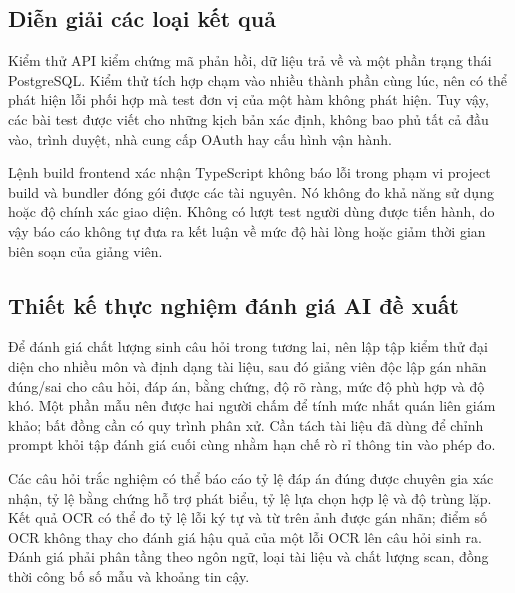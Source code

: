 \subsection{Diễn giải các loại kết quả}
Kiểm thử API kiểm chứng mã phản hồi, dữ liệu trả về và một phần trạng thái
PostgreSQL. Kiểm thử tích hợp chạm vào nhiều thành phần cùng lúc, nên có
thể phát hiện lỗi phối hợp mà test đơn vị của một hàm không phát hiện.
Tuy vậy, các bài test được viết cho những kịch bản xác định, không bao phủ
tất cả đầu vào, trình duyệt, nhà cung cấp OAuth hay cấu hình vận hành.

Lệnh build frontend xác nhận TypeScript không báo lỗi trong phạm vi
project build và bundler đóng gói được các tài nguyên. Nó không đo khả
năng sử dụng hoặc độ chính xác giao diện. Không có lượt test người dùng
được tiến hành, do vậy báo cáo không tự đưa ra kết luận về mức độ hài lòng
hoặc giảm thời gian biên soạn của giảng viên.

\subsection{Thiết kế thực nghiệm đánh giá AI đề xuất}
Để đánh giá chất lượng sinh câu hỏi trong tương lai, nên lập tập kiểm thử
đại diện cho nhiều môn và định dạng tài liệu, sau đó giảng viên độc lập
gán nhãn đúng/sai cho câu hỏi, đáp án, bằng chứng, độ rõ ràng, mức độ phù
hợp và độ khó. Một phần mẫu nên được hai người chấm để tính mức nhất quán
liên giám khảo; bất đồng cần có quy trình phân xử. Cần tách tài liệu đã
dùng để chỉnh prompt khỏi tập đánh giá cuối cùng nhằm hạn chế rò rỉ thông
tin vào phép đo.

Các câu hỏi trắc nghiệm có thể báo cáo tỷ lệ đáp án đúng được chuyên gia
xác nhận, tỷ lệ bằng chứng hỗ trợ phát biểu, tỷ lệ lựa chọn hợp lệ và
độ trùng lặp. Kết quả OCR có thể đo tỷ lệ lỗi ký tự và từ trên ảnh được
gán nhãn; điểm số OCR không thay cho đánh giá hậu quả của một lỗi OCR lên
câu hỏi sinh ra. Đánh giá phải phân tầng theo ngôn ngữ, loại tài liệu và
chất lượng scan, đồng thời công bố số mẫu và khoảng tin cậy.

